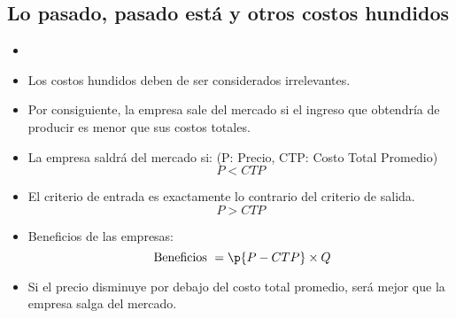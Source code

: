 \documentclass{article}
\begin{document}
\subsection{Lo pasado, pasado está y otros costos hundidos}
\begin{itemize}
    \item {} 
    \item Los costos hundidos deben de ser considerados irrelevantes.
    \item  Por consiguiente, la empresa sale del mercado si el ingreso que obtendría de producir es menor que sus costos totales. 
    \item La empresa saldrá del mercado si: (P: Precio, CTP: Costo Total Promedio)
        \[
          P < CTP
        \]
    
    \item El criterio de entrada es exactamente lo contrario del criterio de salida. 
        \[
          P > CTP
        \]
    
    \item Beneficios de las empresas:
        \[
          \text{ Beneficios } = \p{P-CTP} \times Q
        \]
    
    \item Si el precio disminuye por debajo del costo total promedio, será mejor que la empresa salga del mercado.
\end{itemize}
\end{document}
